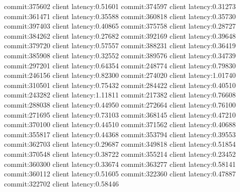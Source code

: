 commit:375602 client latency:0.51601
commit:374597 client latency:0.31273
commit:361471 client latency:0.35588
commit:360818 client latency:0.35730
commit:397403 client latency:0.40865
commit:375758 client latency:0.28727
commit:384262 client latency:0.27682
commit:392169 client latency:0.39648
commit:379720 client latency:0.57557
commit:388231 client latency:0.36419
commit:385908 client latency:0.32552
commit:389576 client latency:0.34739
commit:297201 client latency:0.64354
commit:248774 client latency:0.79830
commit:246156 client latency:0.82300
commit:274020 client latency:1.01740
commit:310501 client latency:0.75432
commit:284422 client latency:0.40510
commit:243282 client latency:1.11811
commit:217382 client latency:0.76608
commit:288038 client latency:0.44950
commit:272664 client latency:0.76100
commit:271695 client latency:0.73103
commit:368145 client latency:0.47210
commit:370100 client latency:0.44510
commit:371562 client latency:0.40688
commit:355817 client latency:0.44368
commit:353794 client latency:0.39553
commit:362703 client latency:0.29687
commit:349818 client latency:0.51854
commit:370548 client latency:0.38722
commit:355214 client latency:0.23452
commit:360300 client latency:0.33674
commit:363277 client latency:0.58141
commit:360112 client latency:0.51605
commit:322360 client latency:0.47887
commit:322702 client latency:0.58446